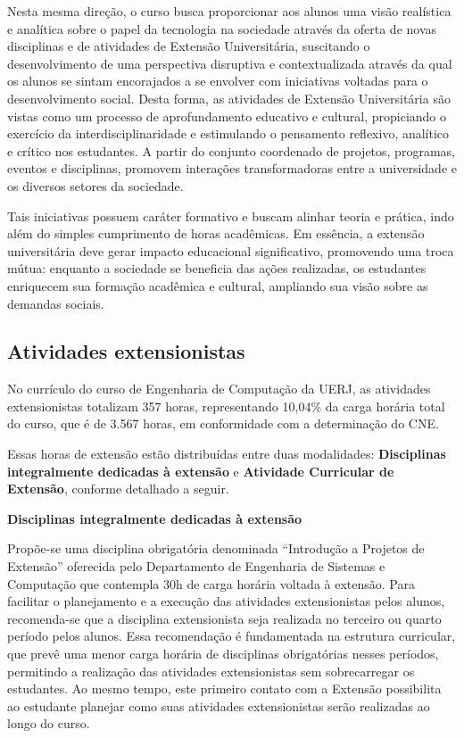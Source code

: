 Nesta mesma direção, o curso busca proporcionar aos alunos uma visão realística e analítica sobre o papel da tecnologia na sociedade através da oferta de novas disciplinas e de atividades de Extensão Universitária, suscitando o desenvolvimento de uma perspectiva disruptiva e contextualizada através da qual os alunos se sintam encorajados a se envolver com iniciativas voltadas para o desenvolvimento social. Desta forma, as atividades de Extensão Universitária são vistas como um processo de aprofundamento educativo e cultural, propiciando o exercício da interdisciplinaridade e estimulando o pensamento reflexivo, analítico e crítico nos estudantes. A partir do conjunto coordenado de projetos, programas, eventos e disciplinas, promovem interações transformadoras entre a universidade e os diversos setores da sociedade.

Tais iniciativas possuem caráter formativo e buscam alinhar teoria e prática, indo além do simples cumprimento de horas acadêmicas. Em essência, a extensão universitária deve gerar impacto educacional significativo, promovendo uma troca mútua: enquanto a sociedade se beneficia das ações realizadas, os estudantes enriquecem sua formação acadêmica e cultural, ampliando sua visão sobre as demandas sociais.

\subsection{Atividades extensionistas}

No currículo do curso de Engenharia de Computação da UERJ, as atividades extensionistas totalizam 357 horas, representando 10,04\% da carga horária total do curso, que é de 3.567 horas, em conformidade com a determinação do CNE.

Essas horas de extensão estão distribuídas entre duas modalidades: \textbf{Disciplinas integralmente dedicadas à extensão} e \textbf{Atividade Curricular de Extensão}, conforme detalhado a seguir.

\textbf{Disciplinas integralmente dedicadas à extensão}

Propõe-se uma disciplina obrigatória denominada “Introdução a Projetos de Extensão” oferecida pelo Departamento de Engenharia de Sistemas e Computação que contempla 30h de carga horária voltada à extensão. Para facilitar o planejamento e a execução das atividades extensionistas pelos alunos, recomenda-se que a disciplina  extensionista seja realizada no terceiro ou quarto período pelos alunos. Essa recomendação é fundamentada na estrutura curricular, que prevê uma menor carga horária de disciplinas obrigatórias nesses períodos, permitindo a realização das atividades extensionistas sem sobrecarregar os estudantes. Ao mesmo tempo, este primeiro contato com a Extensão possibilita ao estudante planejar como suas atividades extensionistas serão realizadas ao longo do curso.


